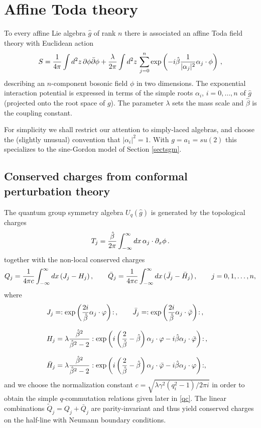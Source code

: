 \documentclass[a4paper,12pt]{article}
\newcommand{\hb}{\hat{\beta}}
\numberwithin{equation}{section}
\begin{document}
\section{Affine Toda theory\label{sectatt}}

To every affine Lie algebra $\hat{g}$ of rank $n$ there is
associated an affine Toda field theory \cite{Mik81} with Euclidean
action
\begin{equation} S = {1\over 4\pi} \int d^2z\,\partial\phi \bar{\partial}\phi
+{\lambda\over 2\pi} \int d^2z\,
\sum_{j=0}^n\exp\left(-i\hb{1\over|\alpha_j|^2} \alpha_j\cdot\phi
\right)\,,\end{equation} describing an $n$-component bosonic field
$\phi$ in two dimensions. The exponential interaction potential is
expressed in terms of the simple roots $\alpha_i$, $i=0,\dots,n$
of $\hat{g}$ (projected onto the root space of $g$). The parameter
$\lambda$ sets the mass scale and $\hb$ is the coupling constant.

For simplicity we shall restrict our attention to simply-laced
algebras, and choose the (slightly unusual) convention that
$|\alpha_i|^2=1$. With $g=a_1=su(2)$ this specializes to the
sine-Gordon model of Section \ref{sectsgm}.

\subsection{Conserved charges from conformal perturbation theory\label{sectcccpt}}

The quantum group symmetry algebra $U_q(\hat{g})$ is generated by
the topological charges
\begin{equation}
  T_j = {\hb\over 2\pi}\int_{-\infty}^\infty dx\, \alpha_j\cdot
  \partial_x\phi\,.
\end{equation}
together with the non-local conserved charges
\begin{equation}
Q_j = {1\over 4\pi c} \int_{-\infty}^\infty dx\,(J_j-H_j)\,,\qquad
\bar{Q}_j={1\over 4\pi c} \int_{-\infty}^\infty
dx\,(\bar{J}_j-\bar{H}_j)\,,\qquad j=0,1,\ldots,n,
\end{equation}
where
\begin{eqnarray}
& J_j = :\exp\left( {2i\over\hb} \alpha_j\cdot \varphi \right)\!:
\,,\qquad \bar{J}_j = :\exp\left(
{2i\over\hb} \alpha_j\cdot \bar{\varphi}\right)\!:\,,&\\[0.1in] & H_j =
\lambda{\hb^2\over \hb^2-2}:\exp\left(
i\left({2\over\hb}-\hb\right)\alpha_j\cdot \varphi
-i\hb\alpha_j\cdot \bar{\varphi} \right)\!: \,,&\\[0.1in] & \bar{H}_j =
\lambda{\hb^2\over \hb^2-2}:\exp\left(
i\left({2\over\hb}-\hb\right)\alpha_j\cdot \bar{\varphi}
-i\hb\alpha_j\cdot \varphi \right)\!:,
\end{eqnarray}
and we choose the normalization constant
$c=\sqrt{\lambda\gamma^2(q_i^2-1)/2\pi i}$  in order to obtain the
simple $q$-commutation relations given later in \eqref{qc}. The
linear combinations $\tilde{Q}_j=Q_j+\bar{Q}_j$ are
parity-invariant and thus yield conserved charges on the half-line
with Neumann boundary conditions.
\end{document}
